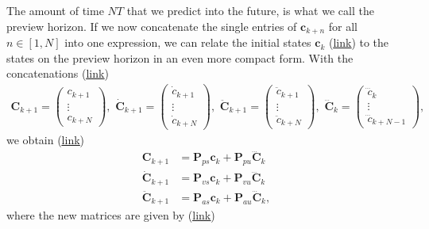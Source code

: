 The amount of time $NT$ that we predict into the future, is what we call the preview horizon. If we now concatenate the single entries of $\bm{c}_{k+n}$ for all $n\in[1,N]$ into one expression, we can relate the initial states $\bm{c}_k$ (\href{https://github.com/mhubii/nmpc_pattern_generator/blob/5a213044c927dc6aac9f7e32ce1e5fb472cd67bb/libs/pattern_generator/include/pattern_generator/base_generator.h#L140}{\underline{link}}) to the states on the preview horizon in an even more compact form. With the concatenations (\href{https://github.com/mhubii/nmpc_pattern_generator/blob/5a213044c927dc6aac9f7e32ce1e5fb472cd67bb/libs/pattern_generator/include/pattern_generator/base_generator.h#L146}{\underline{link}})
\begin{align}
	\bm{C}_{k+1}=\begin{pmatrix}
	c_{k+1}\\
	\vdots\\
	c_{k+N}
	\end{pmatrix},\,\,
	\dot{\bm{C}}_{k+1}=\begin{pmatrix}
	\dot{c}_{k+1}\\
	\vdots\\
	\dot{c}_{k+N}
	\end{pmatrix},\,\,
	\ddot{\bm{C}}_{k+1}=\begin{pmatrix}
	\ddot{c}_{k+1}\\
	\vdots\\
	\ddot{c}_{k+N}
	\end{pmatrix},\,\,
	\dddot{\bm{C}}_{k}=\begin{pmatrix}
	\dddot{c}_{k}\\
	\vdots\\
	\dddot{c}_{k+N-1}
	\end{pmatrix},
\end{align}
we obtain (\href{https://github.com/mhubii/nmpc_pattern_generator/blob/5a213044c927dc6aac9f7e32ce1e5fb472cd67bb/libs/pattern_generator/src/base_generator.cpp#L887}{\underline{link}})
\begin{align}
	\bm{C}_{k+1} &= \bm{P}_{ps} \bm{c}_k + \bm{P}_{pu}\dddot{\bm{C}}_k
	\label{eq::312_ckp1}\\
	\dot{\bm{C}}_{k+1} &= \bm{P}_{vs} \bm{c}_k + \bm{P}_{vu}\dddot{\bm{C}}_k
	\label{eq::312_dckp1}\\
	\ddot{\bm{C}}_{k+1} &= \bm{P}_{as} \bm{c}_k + \bm{P}_{au}\dddot{\bm{C}}_k,
	\label{eq::312_ddckp1}
\end{align}
where the new matrices are given by (\href{https://github.com/mhubii/nmpc_pattern_generator/blob/5a213044c927dc6aac9f7e32ce1e5fb472cd67bb/libs/pattern_generator/src/base_generator.cpp#L403}{\underline{link}})
